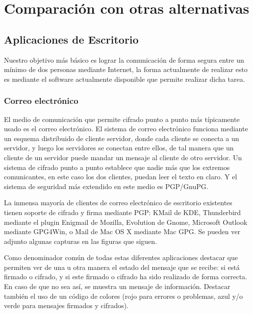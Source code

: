 \chapter{Comparación con otras alternativas}\label{alternativas}
\section{Aplicaciones de Escritorio}\label{aplicacionesdeescritorio}

Nuestro objetivo más básico es lograr la comunicación de forma segura entre un mínimo de dos personas mediante Internet, la forma actualmente de realizar esto es mediante el software actualmente disponible que permite realizar dicha tarea.

\subsection{Correo electrónico}\label{appescritorio_correoelectronico}

El medio de comunicación que permite cifrado punto a punto más típicamente usado es el correo electrónico. El sistema de correo electrónico funciona mediante un esquema distribuido de cliente servidor, donde cada cliente se conecta a un servidor, y luego los servidores se conectan entre ellos, de tal manera que un cliente de un servidor puede mandar un mensaje al cliente de otro servidor. Un sistema de cifrado punto a punto establece que nadie más que los extremos comunicantes, en este caso los dos clientes, puedan leer el texto en claro. Y el sistema de seguridad más extendido en este medio es PGP/GnuPG.

La inmensa mayoría de clientes de correo electrónico de escritorio existentes tienen soporte de cifrado y firma mediante PGP: KMail de KDE, Thunderbird mediante el plugin Enigmail de Mozilla, Evolution de Gnome, Microsoft Outlook mediante GPG4Win, o Mail de Mac OS X mediante Mac GPG. Se pueden ver adjunto algunas capturas en las figuras que siguen.


Como denominador común de todas estas diferentes aplicaciones destacar que permiten ver de una u otra manera el estado del mensaje que se recibe: si está firmado o cifrado, y si este firmado o cifrado ha sido realizado de forma correcta. En caso de que no sea así, se muestra un mensaje de información. Destacar también el uso de un código de colores (rojo para errores o problemas, azul y/o verde para mensajes firmados y cifrados).

